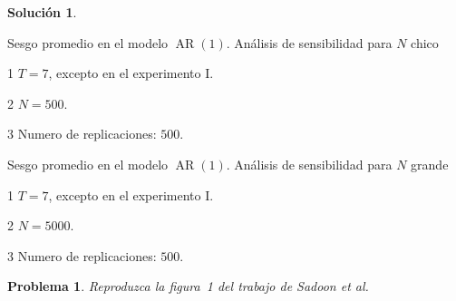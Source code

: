 \documentclass[12pt,letterpaper,reqno,oneside]{amsart}
\theoremstyle{problemstyle} %
\newtheorem{problem}{Problema}
\theoremstyle{definition} %
\newtheorem{solution}{Solución}[problem]
\renewcommand{\thesolution}{\theproblem~(\alph{solution})}
\DeclareMathOperator{\ar}{AR}
\begin{document}
\begin{solution}
  \begin{table}[htbp]
    \begin{threeparttable}[htbp]
      \centering
      \caption{Sesgo promedio en el modelo $\ar(1)$. Análisis de sensibilidad para $N$ chico}
      \label{tab:table2}
      
      \begin{tablenotes}[flushleft]
        \item [1] $T = 7$, excepto en el experimento I.
        \item [2] $N = 500$.
        \item [3] Numero de replicaciones: $500$.
      \end{tablenotes}
    \end{threeparttable}
  \end{table}
  \begin{table}[htbp]
    \begin{threeparttable}[htbp]
      \centering
      \caption{Sesgo promedio en el modelo $\ar(1)$. Análisis de sensibilidad para $N$ grande}
      \label{tab:table3}
      
      \begin{tablenotes}[flushleft]
        \item [1] $T = 7$, excepto en el experimento I.
        \item [2] $N = 5000$.
        \item [3] Numero de replicaciones: $500$.
      \end{tablenotes}
    \end{threeparttable}
  \end{table}
\end{solution}
\endgroup
\begin{mdframed}
  \begin{problem}
  \label{prob:2}
  Reproduzca la figura~1 del trabajo de Sadoon et al.
  \end{problem}
\end{mdframed}
\begingroup
\renewcommand{\thesolution}{\theproblem}
\end{document}
